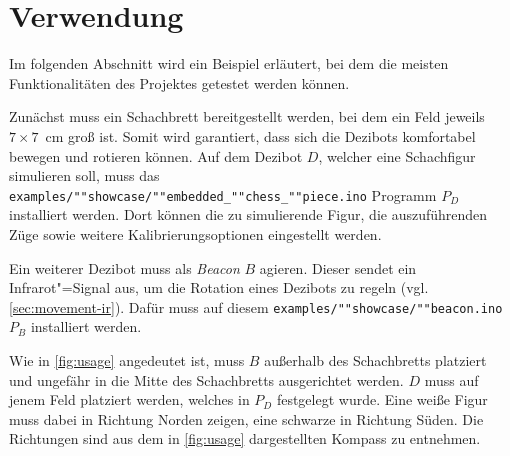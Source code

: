
\section{Verwendung}

Im folgenden Abschnitt wird ein Beispiel erläutert, bei dem die meisten Funktionalitäten des Projektes getestet werden können.

Zunächst muss ein Schachbrett bereitgestellt werden, bei dem ein Feld jeweils \mbox{$7\times7$~cm} groß ist. Somit wird garantiert, dass sich die Dezibots komfortabel bewegen und rotieren können. Auf dem Dezibot $D$, welcher eine Schachfigur simulieren soll, muss das \texttt{examples/""showcase/""embedded\_""chess\_""piece.ino} Programm $P_D$ installiert werden. Dort können die zu simulierende Figur, die auszuführenden Züge sowie weitere Kalibrierungsoptionen eingestellt werden.

Ein weiterer Dezibot muss als \emph{Beacon} $B$ agieren. Dieser sendet ein Infrarot"=Signal aus, um die Rotation eines Dezibots zu regeln (vgl. \autoref{sec:movement-ir}). Dafür muss auf diesem \texttt{examples/""showcase/""beacon.ino} $P_B$ installiert werden.

Wie in \autoref{fig:usage} angedeutet ist, muss $B$ außerhalb des Schachbretts platziert und ungefähr in die Mitte des Schachbretts ausgerichtet werden. $D$ muss auf jenem Feld platziert werden, welches in $P_D$ festgelegt wurde. Eine weiße Figur muss dabei in Richtung Norden zeigen, eine schwarze in Richtung Süden. Die Richtungen sind aus dem in \autoref{fig:usage} dargestellten Kompass zu entnehmen.

